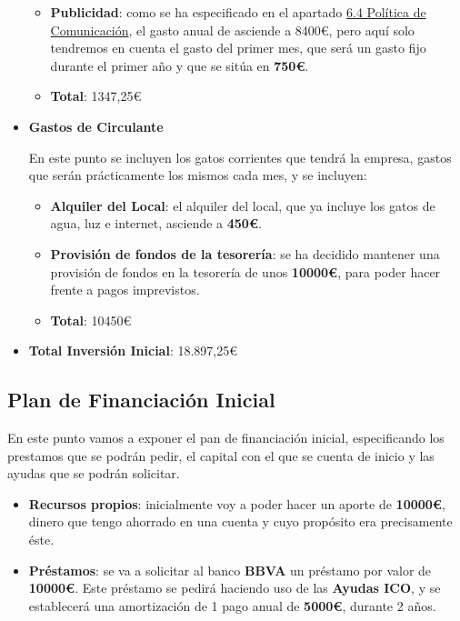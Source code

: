 \begin{itemize}
\begin{itemize}
        \item \textbf{Publicidad}: como se ha especificado en el apartado \hyperref[sec:publi]{6.4 Política de Comunicación}, el gasto anual de asciende a 8400€, pero aquí solo tendremos en cuenta el gasto del primer mes, que será un gasto fijo durante el primer año y que se sitúa en \textbf{750€}.

        \item \textbf{Total}: 1347,25€
    \end{itemize}


    \item \textbf{Gastos de Circulante}

    En este punto se incluyen los gatos corrientes que tendrá la empresa, gastos que serán prácticamente los
    mismos cada mes, y se incluyen:

    \begin{itemize}
        \item \textbf{Alquiler del Local}: el alquiler del local, que ya incluye los gatos de agua, luz e internet, asciende a \textbf{450€}.
        \item \textbf{Provisión de fondos de la tesorería}: se ha decidido mantener una provisión de fondos en la tesorería de unos \textbf{10000€}, para poder hacer frente a pagos imprevistos.

        \item \textbf{Total}: 10450€
    \end{itemize}

    \item \textbf{Total Inversión Inicial}: 18.897,25€
\end{itemize}

\subsection{Plan de Financiación Inicial}
En este punto vamos a exponer el pan de financiación inicial, especificando los prestamos que se podrán pedir,
el capital con el que se cuenta de inicio y las ayudas que se podrán solicitar.

\begin{itemize}
    \item \textbf{Recursos propios}: inicialmente voy a poder hacer un aporte de \textbf{10000€}, dinero que tengo ahorrado en una cuenta y cuyo propósito era precisamente éste.
    \item \textbf{Préstamos}: se va a solicitar al banco \textbf{BBVA} un préstamo por valor de \textbf{10000€}. Este préstamo se pedirá haciendo uso de las \textbf{Ayudas ICO}, y se establecerá una amortización de 1 pago anual de \textbf{5000€}, durante 2 años.
\end{itemize}

